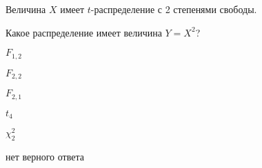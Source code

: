
\begin{question}
Величина \(X\) имеет \(t\)-распределение с 2 степенями свободы.

Какое распределение имеет величина \(Y = X^2\)?
\begin{answerlist}
  \item \(F_{1, 2}\)
  \item \(F_{2, 2}\)
  \item \(F_{2, 1}\)
  \item \(t_{4}\)
  \item \(\chi^2_{2}\)
  \item нет верного ответа
\end{answerlist}
\end{question}


